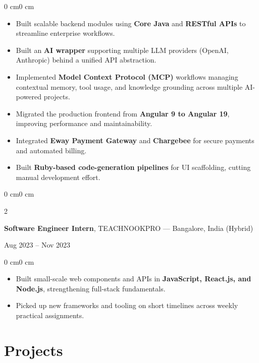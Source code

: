 \documentclass[10pt, letterpaper]{article}
\newenvironment{highlights}{
    \begin{itemize}[
        topsep=0.08 cm,
        parsep=0.08 cm,
        partopsep=0pt,
        itemsep=0pt,
        leftmargin=0.4 cm
    ]
}{
    \end{itemize}
}
\newenvironment{onecolentry}{
    \begin{adjustwidth}{0 cm}{0 cm}
}{
    \end{adjustwidth}
}
\newenvironment{twocolentry}[2][]{
    \onecolentry
    \def\secondColumn{#2}
    \setcolumnwidth{\fill, 4.5 cm}
    \begin{paracol}{2}
}{
    \switchcolumn \raggedleft \secondColumn
    \end{paracol}
    \endonecolentry
}
\begin{document}
    \vspace{0.08 cm}
    \begin{onecolentry}
        \begin{highlights}
            \item Built scalable backend modules using \textbf{Core Java} and \textbf{RESTful APIs} to streamline enterprise workflows.
            \item Built an \textbf{AI wrapper} supporting multiple LLM providers (OpenAI, Anthropic) behind a unified API abstraction.
            \item Implemented \textbf{Model Context Protocol (MCP)} workflows managing contextual memory, tool usage, and knowledge grounding across multiple AI-powered projects.
            \item Migrated the production frontend from \textbf{Angular 9 to Angular 19}, improving performance and maintainability.
            \item Integrated \textbf{Eway Payment Gateway} and \textbf{Chargebee} for secure payments and automated billing.
            \item Built \textbf{Ruby-based code-generation pipelines} for UI scaffolding, cutting manual development effort.
        \end{highlights}
    \end{onecolentry}

    \vspace{0.2 cm}

    \begin{twocolentry}{Aug 2023 -- Nov 2023}
        \textbf{Software Engineer Intern}, TEACHNOOKPRO --- Bangalore, India (Hybrid)
    \end{twocolentry}

    \vspace{0.08 cm}
    \begin{onecolentry}
        \begin{highlights}
            \item Built small-scale web components and APIs in \textbf{JavaScript, React.js, and Node.js}, strengthening full-stack fundamentals.
            \item Picked up new frameworks and tooling on short timelines across weekly practical assignments.
        \end{highlights}
    \end{onecolentry}

    \section{Projects}
\end{document}
